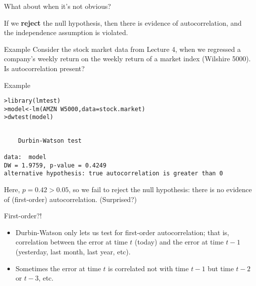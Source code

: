 \documentclass{beamer}\usepackage[]{graphicx}\usepackage[]{color}
\makeatletter
\newcommand{\hlopt}[1]{\textcolor[rgb]{1,0.894,0.769}{#1}}%
\newcommand{\hlstd}[1]{\textcolor[rgb]{1,0.894,0.769}{#1}}%
\newcommand{\hlkwb}[1]{\textcolor[rgb]{0.804,0.776,0.451}{#1}}%
\newcommand{\hlkwc}[1]{\textcolor[rgb]{0.78,0.941,0.545}{#1}}%
\newcommand{\hlkwd}[1]{\textcolor[rgb]{1,0.78,0.769}{#1}}%
\newenvironment{kframe}{%
 \def\at@end@of@kframe{}%
 \ifinner\ifhmode%
  \def\at@end@of@kframe{\end{minipage}}%
  \begin{minipage}{\columnwidth}%
 \fi\fi%
 \def\FrameCommand##1{\hskip\@totalleftmargin \hskip-\fboxsep
 \colorbox{shadecolor}{##1}\hskip-\fboxsep
     \hskip-\linewidth \hskip-\@totalleftmargin \hskip\columnwidth}%
 \MakeFramed {\advance\hsize-\width
   \@totalleftmargin\z@ \linewidth\hsize
   \@setminipage}}%
 {\par\unskip\endMakeFramed%
 \at@end@of@kframe}
\newenvironment{knitrout}{}{} %
\makeatother
\begin{document}
\begin{darkframes}
\begin{frame}{What about when it's not obvious?}
      \bigskip\pause

      If we \textbf{reject} the null hypothesis, then there is evidence of autocorrelation, and the independence assumption is violated.
    \end{frame}

    \begin{frame}{Example}
      Consider the stock market data from Lecture 4, when we regressed a company's weekly return on the weekly return of a market index (Wilshire 5000). Is autocorrelation present?

\begin{knitrout}


\end{knitrout}
    \end{frame}

    \begin{frame}[fragile]{Example}
      \fontsm
\begin{knitrout}
\begin{kframe}
\begin{alltt}
\hlstd{> }\hlkwd{library}\hlstd{(lmtest)}
\hlstd{> }\hlstd{model} \hlkwb{<-} \hlkwd{lm}\hlstd{(AMZN} \hlopt{~} \hlstd{W5000,} \hlkwc{data}\hlstd{=stock.market)}
\hlstd{> }\hlkwd{dwtest}\hlstd{(model)}
\end{alltt}
\begin{verbatim}

	Durbin-Watson test

data:  model
DW = 1.9759, p-value = 0.4249
alternative hypothesis: true autocorrelation is greater than 0
\end{verbatim}
\end{kframe}
\end{knitrout}
      Here, $p=0.42>0.05$, so we fail to reject the null hypothesis: there is no evidence of (first-order) autocorrelation. \pause (Surprised?)
    \end{frame}

    \begin{frame}{First-order?!}
      \begin{itemize}
        \item Durbin-Watson only lets us test for \alert{first-order} autocorrelation; that is, correlation between the error at time $t$ (today) and the error at time $t-1$ (yesterday, last month, last year, etc).
        \item Sometimes the error at time $t$ is correlated not with time $t-1$ but time $t-2$ or $t-3$, etc.
      \end{itemize}
    \end{frame}


\end{darkframes}
\end{document}
